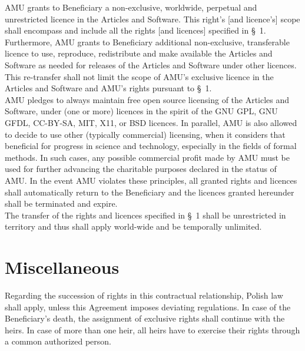 \A AMU grants to Beneficiary a non-exclusive, worldwide, perpetual
and unrestricted licence in the Articles and Software. This right's [and licence's]
scope shall encompass and include all the rights [and licences]
specified in {\S}~1. Furthermore, AMU grants to Beneficiary
additional non-exclusive, transferable licence to use, reproduce,
redistribute and make available the Articles and Software as needed for releases of
the Articles and Software under other licences.  This re-transfer shall not limit
the scope of AMU's exclusive licence in the Articles and Software and AMU's
rights pursuant to {\S}~1.\\

\A AMU pledges to always maintain free open source licensing of the
Articles and Software, under (one or more) licences in the
spirit of the GNU GPL, GNU GFDL, CC-BY-SA, MIT, X11, or BSD licences.
In parallel, AMU is also allowed to
decide to use other (typically commercial) licensing, when it
considers that beneficial for progress in science and technology,
especially in the fields of formal methods. In such cases, any
possible commercial profit made by AMU must be used for further
advancing the charitable purposes declared in the status of AMU. In
the event AMU violates these principles, all granted rights and
licences shall automatically return to the Beneficiary and the
licences granted hereunder shall be terminated and expire.\\


\A The transfer of the rights and licences specified in {\S}~1 shall
be unrestricted in territory and thus shall apply world-wide and be
temporally unlimited.

\section{Miscellaneous}
\A Regarding the succession of rights in this contractual
relationship, Polish law shall apply, unless this Agreement imposes
deviating regulations. In case of the Beneficiary's death, the
assignment of exclusive rights shall continue with the heirs. In case
of more than one heir, all heirs have to exercise their rights through
a common authorized person.\\

